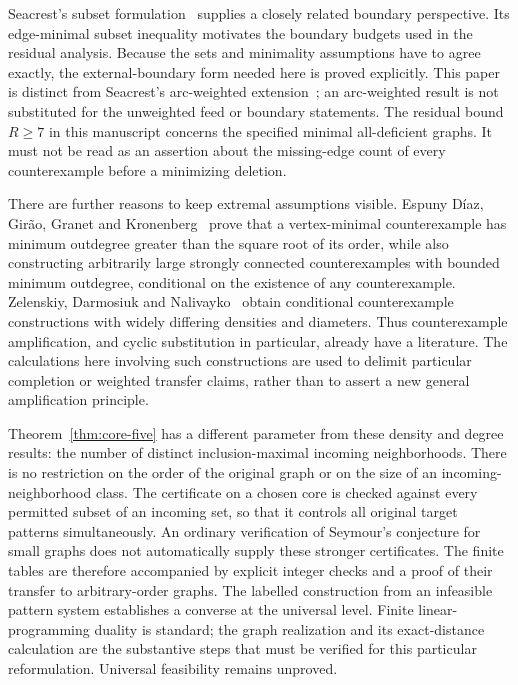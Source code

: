 Seacrest's subset formulation~\cite{SeacrestSubsets2019} supplies a closely
related boundary perspective. Its edge-minimal subset inequality motivates
the boundary budgets used in the residual analysis. Because the sets and
minimality assumptions have to agree exactly, the external-boundary form
needed here is proved explicitly. This paper is distinct from Seacrest's
arc-weighted extension~\cite{Seacrest2015}; an arc-weighted result is not
substituted for the unweighted feed or boundary statements. The residual
bound $R\geq 7$ in this manuscript concerns the specified minimal
all-deficient graphs. It must not be read as an assertion about the
missing-edge count of every counterexample before a minimizing deletion.

There are further reasons to keep extremal assumptions visible.
Espuny D\'iaz, Gir\~ao, Granet and
Kronenberg~\cite{EspunyDiazEtAl2025} prove that a vertex-minimal
counterexample has minimum outdegree greater than the square root of its
order, while also constructing arbitrarily large strongly connected
counterexamples with bounded minimum outdegree, conditional on the
existence of any counterexample. Zelenskiy, Darmosiuk and
Nalivayko~\cite{ZelenskiyEtAl2021} obtain conditional counterexample
constructions with widely differing densities and diameters. Thus
counterexample amplification, and cyclic substitution in particular,
already have a literature. The calculations here involving such
constructions are used to delimit particular completion or weighted
transfer claims, rather than to assert a new general amplification
principle.

Theorem~\ref{thm:core-five} has a different parameter from these density
and degree results: the number of distinct inclusion-maximal incoming
neighborhoods. There is no restriction on the order of the original graph
or on the size of an incoming-neighborhood class. The certificate on a
chosen core is checked against every permitted subset of an incoming set,
so that it controls all original target patterns simultaneously. An
ordinary verification of Seymour's conjecture for small graphs does not
automatically supply these stronger certificates. The finite tables are
therefore accompanied by explicit integer checks and a proof of their
transfer to arbitrary-order graphs. The labelled construction from an
infeasible pattern system establishes a converse at the universal level.
Finite linear-programming duality is standard; the graph realization and
its exact-distance calculation are the substantive steps that must be
verified for this particular reformulation. Universal feasibility remains
unproved.

